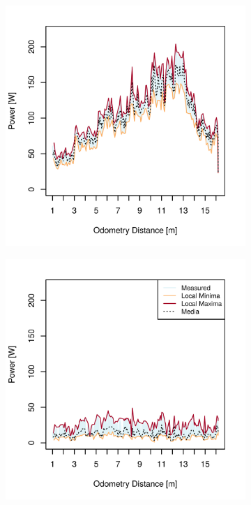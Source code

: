 \begin{figure}[h]
\begin{subfigure}[t]{\subfigureWidth}
	\end{subfigure}\hfill
	\begin{subfigure}[t]{\subfigureWidth}
        \centering
        \includegraphics[height=\graphicsHeight]{sections/locomotion-power-draws/plots/drive-power-draw-on-upslope-terrain.png}
		\label{fig:plot:sub:sherpatt-disaggregated-upslope-terrain-power-draw-drive}
	\end{subfigure}\hfill
    \begin{subfigure}[t]{\subfigureWidth}
        \centering
        \includegraphics[height=\graphicsHeight]{sections/locomotion-power-draws/plots/suspension-power-draw-on-upslope-terrain.png}

\end{subfigure}
\end{figure}
